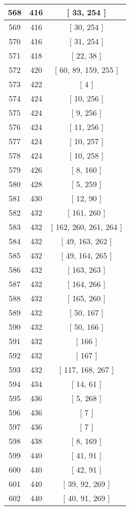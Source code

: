 \begin{center}
\begin{longtable}[H]{|| c c c ||}
\hline
568 & 416 & [ 33, 254 ] \\ 
\hline
569 & 416 & [ 30, 254 ] \\ 
\hline
570 & 416 & [ 31, 254 ] \\ 
\hline
571 & 418 & [ 22, 38 ] \\ 
\hline
572 & 420 & [ 60, 89, 159, 255 ] \\ 
\hline
573 & 422 & [ 4 ] \\ 
\hline
574 & 424 & [ 10, 256 ] \\ 
\hline
575 & 424 & [ 9, 256 ] \\ 
\hline
576 & 424 & [ 11, 256 ] \\ 
\hline
577 & 424 & [ 10, 257 ] \\ 
\hline
578 & 424 & [ 10, 258 ] \\ 
\hline
579 & 426 & [ 8, 160 ] \\ 
\hline
580 & 428 & [ 5, 259 ] \\ 
\hline
581 & 430 & [ 12, 90 ] \\ 
\hline
582 & 432 & [ 161, 260 ] \\ 
\hline
583 & 432 & [ 162, 260, 261, 264 ] \\ 
\hline
584 & 432 & [ 49, 163, 262 ] \\ 
\hline
585 & 432 & [ 49, 164, 265 ] \\ 
\hline
586 & 432 & [ 163, 263 ] \\ 
\hline
587 & 432 & [ 164, 266 ] \\ 
\hline
588 & 432 & [ 165, 260 ] \\ 
\hline
589 & 432 & [ 50, 167 ] \\ 
\hline
590 & 432 & [ 50, 166 ] \\ 
\hline
591 & 432 & [ 166 ] \\ 
\hline
592 & 432 & [ 167 ] \\ 
\hline
593 & 432 & [ 117, 168, 267 ] \\ 
\hline
594 & 434 & [ 14, 61 ] \\ 
\hline
595 & 436 & [ 5, 268 ] \\ 
\hline
596 & 436 & [ 7 ] \\ 
\hline
597 & 436 & [ 7 ] \\ 
\hline
598 & 438 & [ 8, 169 ] \\ 
\hline
599 & 440 & [ 41, 91 ] \\ 
\hline
600 & 440 & [ 42, 91 ] \\ 
\hline
601 & 440 & [ 39, 92, 269 ] \\ 
\hline
602 & 440 & [ 40, 91, 269 ] \\ 

\end{longtable}
\end{center}
